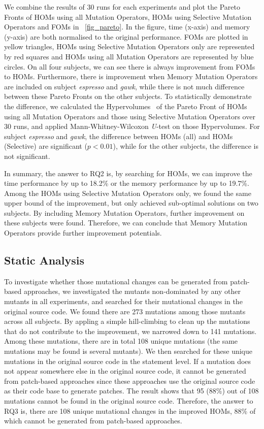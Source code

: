 \documentclass[oribibl]{llncs}
\begin{document}
We combine the results of 30 runs for each experiments and plot the Pareto Fronts of HOMs using all Mutation Operators, HOMs using Selective Mutation Operators and FOMs in \figurename~\ref{fig_pareto}.
In the figure, time (x-axis) and memory (y-axis) are both normalised to the original performance.
FOMs are plotted in yellow triangles, HOMs using Selective Mutation Operators only are represented by red squares and HOMs using all Mutation Operators are represented by blue circles.
On all four subjects, we can see there is always improvement from FOMs to HOMs. 
Furthermore, there is improvement when Memory Mutation Operators are included on subject \emph{espresso} and \emph{gawk}, while there is not much difference between these Pareto Fronts on the other subjects.
To statistically demonstrate the difference, we calculated the Hypervolumes~\cite{797969} of the Pareto Front of HOMs using all Mutation Operators and those using Selective Mutation Operators over 30 runs, and applied Mann-Whitney-Wilcoxon \emph{U}-test on those Hypervolumes.
For subject \emph{espresso} and \emph{gawk}, the difference between HOMs (all) and HOMs (Selective) are significant ($p<0.01$), while for the other subjects, the difference is not significant.

In summary, the answer to RQ2 is, by searching for HOMs, we can improve the time performance by up to 18.2\% or the memory performance by up to 19.7\%. 
Among the HOMs using Selective Mutation Operators only, we found the same upper bound of the improvement, but only achieved sub-optimal solutions on two subjects.
By including Memory Mutation Operators, further improvement on these subjects were found.
Therefore, we can conclude that Memory Mutation Operators provide further improvement potentials.

\subsection{Static Analysis}
\label{sec_resstatic}

To investigate whether those mutational changes can be generated from patch-based approaches, we investigated the mutants non-dominated by any other mutants in all experiments, and searched for their mutational changes in the original source code.
We found there are 273 mutations among those mutants across all subjects.
By appling a simple hill-climbing to clean up the mutations that do not contribute to the improvement, we narrowed down to 141 mutations.
Among these mutations, there are in total 108 unique mutations (the same mutations may be found is several mutants).
We then searched for these unique mutations in the original source code in the statement level.
If a mutation does not appear somewhere else in the original source code, it cannot be generated from patch-based approaches since these approaches use the original source code as their code base to generate patches.
The result shows that 95 (88\%) out of 108 mutations cannot be found in the original source code.
Therefore, the answer to RQ3 is, there are 108 unique mutational changes in the improved HOMs, 88\% of which cannot be generated from patch-based approaches.
\end{document}
